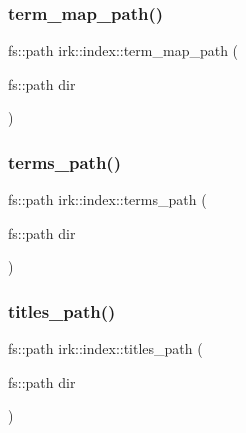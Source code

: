 \subsubsection{\texorpdfstring{term\+\_\+map\+\_\+path()}{term\_map\_path()}}
{\footnotesize\ttfamily fs\+::path irk\+::index\+::term\+\_\+map\+\_\+path (\begin{DoxyParamCaption}\item[{fs\+::path}]{dir }\end{DoxyParamCaption})}

\mbox{\label{namespaceirk_1_1index_a003bce4c8d885ec3e8ffffd7dc53222f}} 
\subsubsection{\texorpdfstring{terms\+\_\+path()}{terms\_path()}}
{\footnotesize\ttfamily fs\+::path irk\+::index\+::terms\+\_\+path (\begin{DoxyParamCaption}\item[{fs\+::path}]{dir }\end{DoxyParamCaption})}

\mbox{\label{namespaceirk_1_1index_a2c4aa814da3f9412179fe44a70fdbe94}} 
\subsubsection{\texorpdfstring{titles\+\_\+path()}{titles\_path()}}
{\footnotesize\ttfamily fs\+::path irk\+::index\+::titles\+\_\+path (\begin{DoxyParamCaption}\item[{fs\+::path}]{dir }\end{DoxyParamCaption})}

